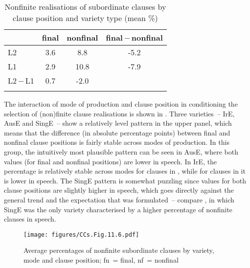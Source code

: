 \vfill
\begin{table}[H]
\caption{\label{bkm:Ref75876810}\label{tab:11.3}Nonfinite realisations of subordinate clauses by clause position and variety type (mean \%)}
\begin{tabular}{l *3{S[table-format=-1.1]}}
\lsptoprule
      & {final} & {nonfinal} & {final\,$-$\,nonfinal}\\\midrule
L2    & 3.6 & 8.8 & -5.2\\
L1    & 2.9 & 10.8 & -7.9\\
L2\,$-$\,L1 & 0.7 & -2.0 & \\
\lspbottomrule
\end{tabular}
\end{table}
\vfill\pagebreak

The interaction of mode of production and clause position in conditioning the selection of (non)finite clause realisations is shown in . Three varieties~– IrE, AusE and SingE~– show a relatively level pattern in the upper panel, which means that the difference (in absolute percentage points) between final and nonfinal clause positions is fairly stable across modes of production. In this group, the intuitively most plausible pattern can be seen in AusE, where both values (for final and nonfinal positions) are lower in speech. In IrE, the percentage is relatively stable across modes for clauses in , while for clauses in  it is lower in speech. The SingE pattern is somewhat puzzling since values for both clause positions are slightly higher in speech, which goes directly against the general trend and the expectation that was formulated~– compare , in which SingE was the only variety characterised by a higher percentage of nonfinite clauses in speech.

\begin{figure}
\texttt{[image: figures/CCs.Fig.11.6.pdf]}
\caption{\label{bkm:Ref75876892}\label{fig:11.6}Average percentages of nonfinite subordinate clauses by variety, mode and clause position; fn~= final, nf~= nonfinal}
\end{figure}

